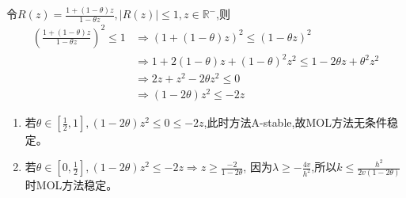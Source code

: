 \documentclass[UTF8]{ctexart}
\begin{document}
令$R(z) = \frac{1+(1-\theta)z}{1-\theta z}, |R(z)|\leq 1, z\in \mathbb{R}^{-}$,则
\begin{equation}
    \begin{aligned}
        (\frac{1+(1-\theta)z}{1-\theta z})^2 \leq 1 &\Rightarrow (1+(1-\theta)z)^2 \leq (1-\theta z)^2 \\
                                                    &\Rightarrow 1 + 2(1-\theta)z + (1-\theta)^2z^2 \leq 1 - 2\theta z + \theta^2z^2 \\
                                                    &\Rightarrow 2z + z^2 -2\theta z^2 \leq 0 \\
                                                    &\Rightarrow (1 - 2\theta )z^2 \leq -2z
    \end{aligned}
\end{equation}
\begin{enumerate}
    \item 若$\theta \in [\frac{1}{2}, 1], (1-2\theta)z^2 \leq 0 \leq -2z$,此时方法A-stable,故MOL方法无条件稳定。
    \item 若$\theta \in [0, \frac{1}{2}] ,(1 - 2\theta )z^2 \leq -2z\Rightarrow z \geq \frac{-2}{1-2\theta}$,
          因为$\lambda \geq -\frac{4v}{h^2}$,所以$k \leq \frac{h^2}{2v(1-2\theta)}$时MOL方法稳定。
\end{enumerate}


\end{document}
